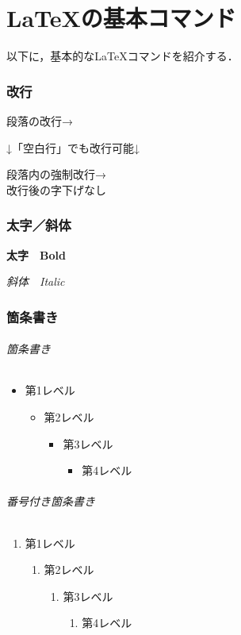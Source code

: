 \documentclass[dvipdfmx]{jsarticle} %
\theoremstyle{definition} %
\begin{document}
\part{\LaTeX の基本コマンド}
以下に，基本的な\LaTeX コマンドを紹介する．

\section{改行}
段落の改行→\par
↓「空白行」でも改行可能↓

段落内の強制改行→\\
改行後の字下げなし

\section{太字／斜体}
\textbf{太字　Bold}\par
\textit{斜体　Italic}

\section{箇条書き}
\paragraph{箇条書き}
\begin{itemize}
  \item 第1レベル
  \begin{itemize}
    \item 第2レベル
    \begin{itemize}
      \item 第3レベル
      \begin{itemize}
        \item 第4レベル
      \end{itemize}
    \end{itemize}
  \end{itemize}
\end{itemize}

\paragraph{番号付き箇条書き}
\begin{enumerate}
  \item 第1レベル
  \begin{enumerate}
    \item 第2レベル
    \begin{enumerate}
      \item 第3レベル
      \begin{enumerate}
        \item 第4レベル
      \end{enumerate}
    \end{enumerate}
  \end{enumerate}
\end{enumerate}
\end{document}
